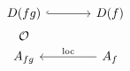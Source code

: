 \[
\begin{tikzcd}[column sep=large]
D(fg) \arrow[r, hook] \arrow[d, "\OO"', phantom] & D(f) \\
A_{fg} & A_f \arrow[l, "\mathrm{loc}"']
\end{tikzcd}
\]
